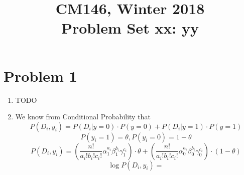 \documentclass[11pt]{article}
\newcommand{\cnum}{CM146}
\newcommand{\ced}{Winter 2018}
\newcommand{\ctitle}[3]{\title{\vspace{-0.5in}\cnum, \ced\\Problem Set #1: #2}}
\newcommand{\solution}[1]{{{\color{blue}{\bf Solution:} {#1}}}}
\begin{document}
\ctitle{xx}{yy}
\author{}
\date{}
\maketitle
\vspace{-0.75in}

\section{Problem 1}
\begin{enumerate}
\item \solution{} \newline
TODO

\item \solution{} \newline
We know from Conditional Probability that
$$
P(D_i, y_i) = P(D_i | y = 0) \cdot P (y = 0) + P(D_i | y = 1) \cdot P (y = 1)
$$
$$
P(y_i = 1) = \theta, P(y_i = 0) = 1 - \theta
$$
$$
P(D_i, y_i) = \left(\frac{n!}{a_i ! b_i ! c_i !} \alpha_1^{a_i} \beta_1^{b_i} \gamma_1^{c_i} \right) \cdot \theta
				+ \left(\frac{n!}{a_i ! b_i ! c_i !} \alpha_0^{a_i} \beta_0^{b_i} \gamma_0^{c_i} \right) \cdot (1 - \theta)
$$
$$
\log P(D_i, y_i) = 
$$
\end{enumerate}

\newpage
\end{document}
